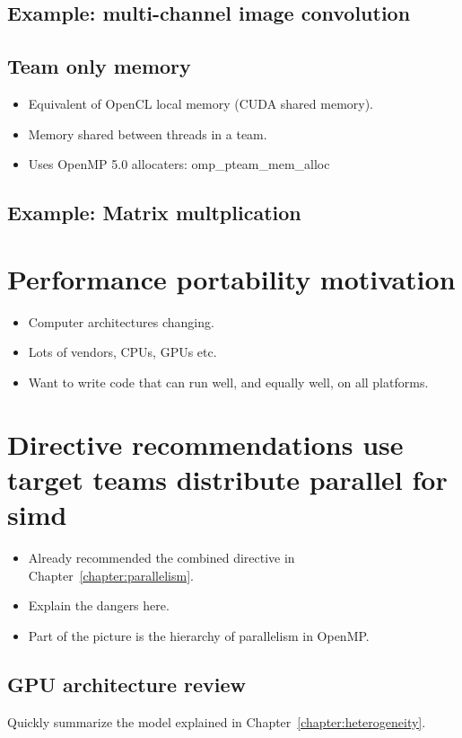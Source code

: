 \subsection{Example: multi-channel image convolution}

\subsection{Team only memory}
\begin{itemize}
  \item Equivalent of OpenCL local memory (CUDA shared memory).
  \item Memory shared between threads in a team.
  \item Uses OpenMP 5.0 allocaters: omp\_pteam\_mem\_alloc
\end{itemize}
\subsection{Example: Matrix multplication}

\section{Performance portability motivation}
\begin{itemize}
  \item Computer architectures changing.
  \item Lots of vendors, CPUs, GPUs etc.
  \item Want to write code that can run well, and equally well, on all platforms.
\end{itemize}


\section{Directive recommendations use target teams distribute parallel for simd}
\begin{itemize}
  \item Already recommended the combined directive in Chapter~\ref{chapter:parallelism}.
  \item Explain the dangers here.
  \item Part of the picture is the hierarchy of parallelism in OpenMP.
\end{itemize}

\subsection{GPU architecture review}
Quickly summarize the model explained in Chapter~\ref{chapter:heterogeneity}.

